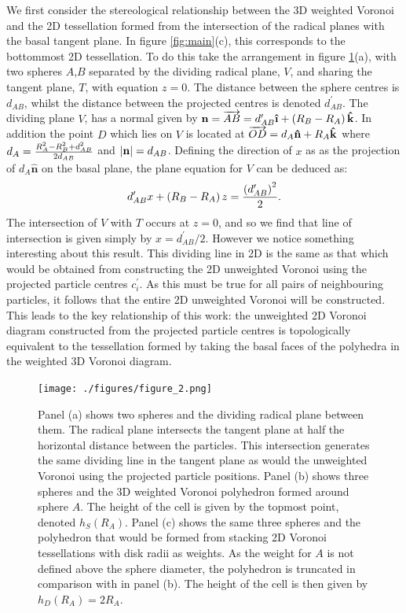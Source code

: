 We first consider the stereological relationship between the 3D weighted Voronoi and the 2D tessellation formed from the intersection of the radical planes with the basal tangent plane.
In figure \ref{fig:main}(c), this corresponds to the bottommost 2D tessellation.
To do this take the arrangement in figure \ref{fig:geometry}(a), with two spheres $A$,$B$ separated by the dividing radical plane, $V$, and sharing the tangent plane, $T$, with equation $z=0$.
The distance between the sphere centres is $d_{AB}$, whilst the distance between the projected centres is denoted $d_{AB}^\prime$.
The dividing plane $V$, has a normal given by $\mathbf{n} =\overrightarrow{AB}=d_{AB}^\prime\boldsymbol{\hat{\textbf{\i}}}+\left(\rs_B-\rs_A\right)\mathbf{\hat{k}}$.
In addition the point $D$ which lies on $V$ is located at $\overrightarrow{OD}=d_{A}\mathbf{\hat{n}}+R_A\mathbf{\hat{k}}$ where $d_{A}=\frac{R_A^2-R_B^2+d_{AB}^2}{2d_{AB}}$ and $\lvert\mathbf{n}\rvert=d_{AB}$.
Defining the direction of $x$ as as the projection of $d_A\mathbf{\hat{n}}$ on the basal plane, the plane equation for $V$ can be deduced as:
\begin{equation}
	\label{eq:plane}
	d_{AB}^\prime x+\left(R_B-R_A\right)z=\frac{\left(d_{AB}^\prime\right)^2}{2}.
\end{equation}
The intersection of $V$ with $T$ occurs at $z=0$, and so we find that line of intersection is given simply by $x=d_{AB}^\prime/2$.
However we notice something interesting about this result.
This dividing line in 2D is the same as that which would be obtained from constructing the 2D unweighted Voronoi using the projected particle centres $c^\prime_i$.
As this must be true for all pairs of neighbouring particles, it follows that the entire 2D unweighted Voronoi will be constructed. 
This leads to the key relationship of this work: the unweighted 2D Voronoi diagram constructed from the projected particle centres is topologically equivalent to the tessellation formed by taking the basal faces of the polyhedra in the weighted 3D Voronoi diagram.

\begin{figure}
	\texttt{[image: ./figures/figure\_2.png]}
	\caption{Panel (a) shows two spheres and the dividing radical plane between them. The radical plane intersects the tangent plane at half the horizontal distance between the particles. This intersection generates the same dividing line in the tangent plane as would the unweighted Voronoi using the projected particle positions.
Panel (b) shows three spheres and the 3D weighted Voronoi polyhedron formed around sphere $A$. The height of the cell is given by the topmost point, denoted $h_S\left(R_A\right)$. Panel (c) shows the same three spheres and the polyhedron that would be formed from stacking 2D Voronoi tessellations with disk radii as weights. As the weight for $A$ is not defined above the sphere diameter, the polyhedron is truncated in comparison with in panel (b). The height of the cell is then given by $h_D\left(R_A\right)=2R_A$.}
	\label{fig:geometry}
\end{figure}


